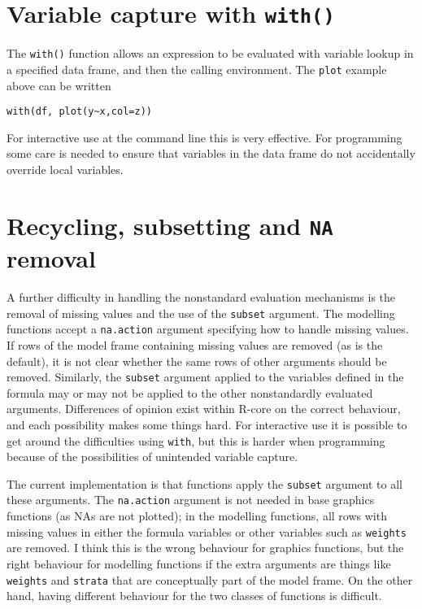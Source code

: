 \documentclass[11pt]{article}
\begin{document}
\section{Variable capture with \texttt{with()}}
The \verb=with()= function allows an expression to be evaluated with variable lookup in a specified data frame,  and then the calling environment. The \texttt{plot} example above can be written
\begin{verbatim}
with(df, plot(y~x,col=z))
\end{verbatim}
For interactive use at the command line this is very effective.  For programming some care is needed to ensure that variables in the data frame do not accidentally override local variables.

\section{Recycling, subsetting and \texttt{NA} removal}
A further difficulty in handling the nonstandard evaluation mechanisms is the removal of missing values and the use of the \texttt{subset} argument.  The modelling functions accept a \texttt{na.action} argument specifying how to handle missing values. If rows of the model frame containing missing values are removed (as is the default), it is not clear whether the same rows of other arguments should be removed.  Similarly, the \texttt{subset} argument applied to the variables defined in the formula may or may not be applied to the other nonstandardly evaluated arguments.  Differences of opinion exist within R-core on the correct behaviour, and each possibility makes some things hard.   For interactive use it is possible to get around the difficulties using \texttt{with}, but this is harder when programming because of the possibilities of unintended variable capture.

The current implementation is that functions apply the \texttt{subset} argument to all these arguments.  The \texttt{na.action} argument is not needed in base graphics functions (as NAs are not plotted); in the modelling functions, all rows with missing values in either the formula variables or other variables such as \texttt{weights} are removed.   I think this is the wrong behaviour for graphics functions, but the right behaviour for modelling functions if the extra arguments are things like \texttt{weights} and \texttt{strata} that are conceptually part of the model frame.  On the other hand, having different behaviour for the two classes of functions is difficult.
\end{document}
